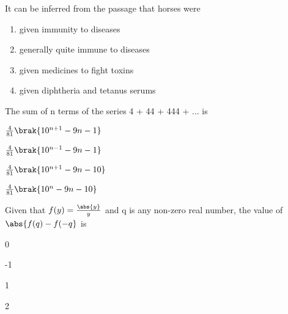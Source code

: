 	It can be inferred from the passage that horses were
	\begin{enumerate}
		\item given immunity to diseases
		\item generally quite immune to diseases
		\item given medicines to fight toxins
		\item given diphtheria and tetanus serums
	\end{enumerate}
\item The sum of n terms of the series 4 + 44 + 444 + $\dots$ is
	\begin{enumerate}
	\end{enumerate}
\item Given that $f(y) = \frac{\abs{y}}{y}$ and q is any non-zero real number, the value of $\abs{f(q) - f(-q}$ is
	\begin{enumerate}
			\begin{multicols}{4}
			\item 0
			\item -1
			\item 1
			\item 2
			\end{multicols}
	\end{enumerate}


